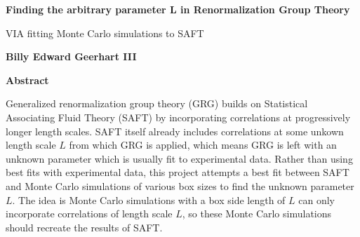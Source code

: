 \thispagestyle{plain}
\begin{center}
	\Large
	\textbf{Finding the arbitrary parameter L in Renormalization Group Theory}
	
	\vspace{0.4cm}
	\large
	VIA fitting Monte Carlo simulations to SAFT
	
	\vspace{0.4cm}
	\textbf{Billy Edward Geerhart III}
	
	\vspace{0.9cm}
	\textbf{Abstract}
\end{center}
Generalized renormalization group theory (GRG) builds on Statistical Associating Fluid Theory (SAFT) by incorporating correlations at progressively longer length scales. SAFT itself already includes correlations at some unkown length scale $L$ from which GRG is applied, which means GRG is left with an unknown parameter which is usually fit to experimental data. Rather than using best fits with experimental data, this project attempts a best fit between SAFT and Monte Carlo simulations of various box sizes to find the unknown parameter $L$. The idea is Monte Carlo simulations with a box side length of $L$ can only incorporate correlations of length scale $L$, so these Monte Carlo simulations should recreate the results of SAFT.


